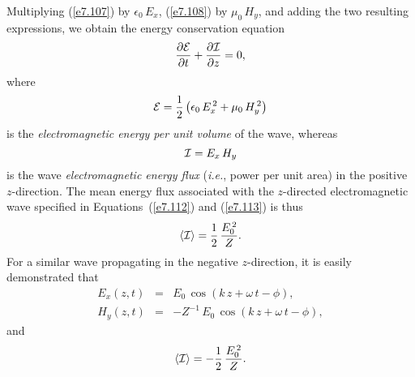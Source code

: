 Multiplying (\ref{e7.107}) by $\epsilon_0\,E_x$, (\ref{e7.108})
by $\mu_0\,H_y$, and adding the two resulting expressions, we obtain the
energy conservation equation
\begin{equation}
\frac{\partial{\cal E}}{\partial t} + \frac{\partial{\cal I}}{\partial z} =0,
\end{equation}
where 
\begin{equation}
{\cal E} = \frac{1}{2}\left(\epsilon_0\,E_x^{\,2} + \mu_0\,H_y^{\,2}\right)
\end{equation}
is the {\em electromagnetic energy per unit volume} of the wave, whereas 
\begin{equation}
{\cal I} = E_x\,H_y
\end{equation}
is the wave {\em electromagnetic energy flux}\/ ({\em i.e.}, power per unit area) in the positive $z$-direction. The mean energy flux associated with the  $z$-directed electromagnetic wave specified
in Equations~(\ref{e7.112}) and (\ref{e7.113}) is thus
\begin{equation}\label{e7.117}
\langle {\cal I} \rangle = \frac{1}{2}\,\frac{E_0^{\,2}}{Z}.
\end{equation}
For a similar wave propagating in the negative $z$-direction, it is easily
demonstrated that
\begin{eqnarray}
E_x(z,t)&=&E_0\,\cos(k\,z+\omega\,t-\phi),\\[0.5ex]
H_y(z,t)&=&-Z^{-1}\,E_0\,\cos(k\,z+\omega\,t-\phi),
\end{eqnarray}
and
\begin{equation}
\langle {\cal I} \rangle =- \frac{1}{2}\,\frac{E_0^{\,2}}{Z}.
\end{equation}

